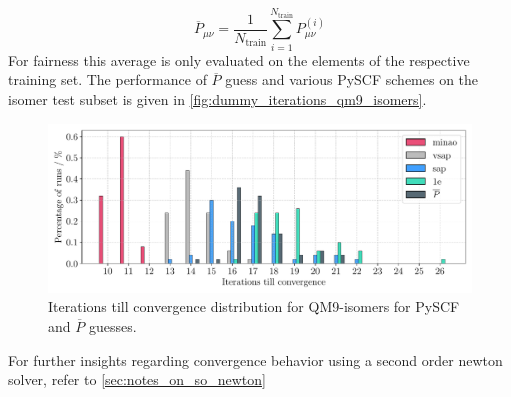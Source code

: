 \begin{equation}
    \label{eq:avg_guess}
    \overline{P}_{\mu\nu} = \frac{1}{N_\text{train}} \sum_{i=1}^{N_\text{train}} P^{(i)}_{\mu\nu}
\end{equation}
For fairness this average is only evaluated on the elements of the respective training set. The performance of $\overline{P}$ guess and various PySCF schemes on the  isomer test subset is given in \autoref{fig:dummy_iterations_qm9_isomers}. 
\begin{figure}[H]
    \centering
    \includegraphics[width=\textwidth]{../fig/gnn/0_d_model_iteration_count_bar.pdf}
    \caption[Iterations till convergence distribution for QM9-isomers]{Iterations till convergence distribution for QM9-isomers for PySCF and $\overline{P}$ guesses.}
    \label{fig:dummy_iterations_qm9_isomers}
\end{figure}

For further insights regarding convergence behavior using a second order newton solver, refer to \autoref{sec:notes_on_so_newton} 